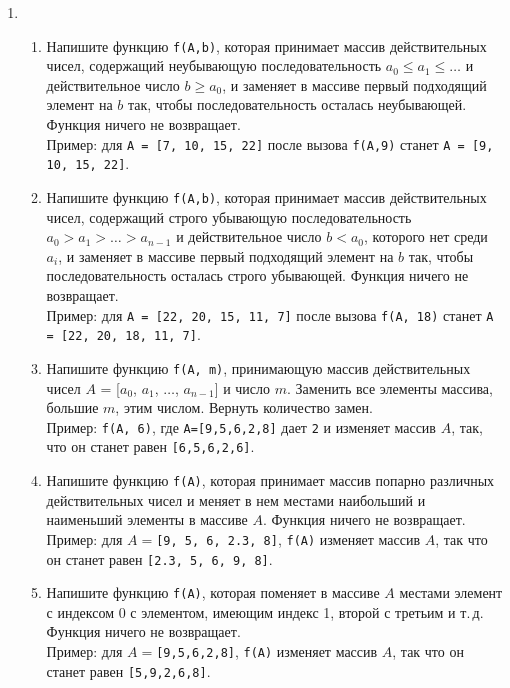 \documentclass{article}
\begin{document}
\begin{enumerate}[label={}, leftmargin=0pt, itemindent=0pt]
\hrulefill
\item
\begin{enumerate}[label=\arabic{enumi}.\arabic*.]
\item 
Напишите функцию \texttt{f(A,b)}, которая принимает массив действительных чисел, содержащий неубывающую последовательность $a_0 \leqslant a_1 \leqslant \ldots$ и действительное число $b\geqslant a_0$, и заменяет в массиве первый подходящий элемент на $b$ так, чтобы последовательность осталась неубывающей. Функция ничего не возвращает.
\\Пример: для \texttt{A = [7, 10, 15, 22]} после вызова \texttt{f(A,9)} станет \texttt{A = [9, 10, 15, 22]}.

\item 
Напишите функцию \texttt{f(A,b)}, которая принимает массив действительных чисел, содержащий строго убывающую последовательность $a_0 > a_1 > \ldots > a_{n-1}$ и действительное число $b<a_0$, которого нет среди $a_i$, и заменяет в массиве первый подходящий элемент на $b$ так, чтобы последовательность осталась строго убывающей. Функция ничего не возвращает.
\\Пример: для \texttt{A = [22, 20, 15, 11, 7]} после вызова \texttt{f(A, 18)} станет \texttt{A = [22, 20, 18, 11, 7]}.

\item 
Напишите функцию \texttt{f(A,\,m)}, принимающую массив действительных чисел $A$ = [$a_0$, $a_1$, $\ldots$, $a_{n-1}$] и число $m$. Заменить все элементы массива, большие $m$, этим числом. Вернуть количество замен.
\\Пример: \texttt{f(A, 6)}, где \texttt{A=[9,5,6,2,8]} дает \texttt{2} и изменяет массив $A$, так, что он станет равен \texttt{[6,5,6,2,6]}.

\item 
Напишите функцию \texttt{f(A)}, которая принимает массив попарно различных действительных чисел и меняет в нем местами наибольший и наименьший элементы в массиве $A$. Функция ничего не возвращает.
\\Пример: для $A=$\texttt{[9, 5, 6, 2.3, 8]}, \texttt{f(A)} изменяет массив $A$, так что он станет равен \texttt{[2.3, 5, 6, 9, 8]}.

\item 
Напишите функцию \texttt{f(A)}, которая поменяет в массиве $A$ местами элемент с индексом 0 с элементом, имеющим индекс 1, второй с третьим и т.\,д. Функция ничего не возвращает.
\\Пример: для $A=$\texttt{[9,5,6,2,8]}, \texttt{f(A)} изменяет массив $A$, так что он станет равен \texttt{[5,9,2,6,8]}.


\end{enumerate}
\end{enumerate}
\end{document}
